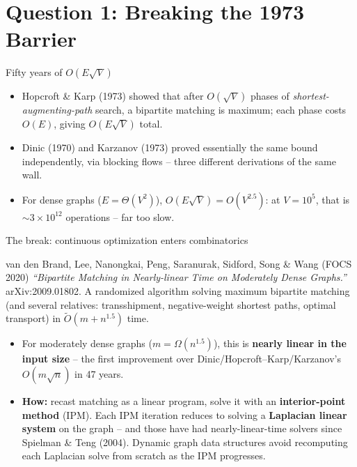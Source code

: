 \documentclass[11pt,aspectratio=169]{beamer}
\begin{document}
\section{Question 1: Breaking the 1973 Barrier}

\begin{frame}{Fifty years of $O(E\sqrt{V})$}
  \begin{itemize}
    \item Hopcroft \& Karp (1973) showed that after $O(\sqrt{V})$ phases of
    \emph{shortest-augmenting-path} search, a bipartite matching is maximum; each
    phase costs $O(E)$, giving $O(E\sqrt{V})$ total.
    \item Dinic (1970) and Karzanov (1973) proved essentially the same bound
    independently, via blocking flows -- three different derivations of the same wall.
    \item For dense graphs ($E = \Theta(V^2)$), $O(E\sqrt{V}) = O(V^{2.5})$: at
    $V=10^5$, that is $\sim 3\times10^{12}$ operations -- far too slow.
  \end{itemize}
\end{frame}

\begin{frame}{The break: continuous optimization enters combinatorics}
  \begin{block}{van den Brand, Lee, Nanongkai, Peng, Saranurak, Sidford, Song \& Wang
  (FOCS 2020)}
    \emph{``Bipartite Matching in Nearly-linear Time on Moderately Dense Graphs.''}
    arXiv:2009.01802. A randomized algorithm solving maximum bipartite matching (and
    several relatives: transshipment, negative-weight shortest paths, optimal
    transport) in $\tilde{O}(m + n^{1.5})$ time.
  \end{block}
  \begin{itemize}
    \item For moderately dense graphs ($m = \Omega(n^{1.5})$), this is
    \textbf{nearly linear in the input size} -- the first improvement over
    Dinic/Hopcroft--Karp/Karzanov's $O(m\sqrt{n})$ in 47 years.
    \item \textbf{How:} recast matching as a linear program, solve it with an
    \textbf{interior-point method} (IPM). Each IPM iteration reduces to solving a
    \textbf{Laplacian linear system} on the graph -- and those have had
    nearly-linear-time solvers since Spielman \& Teng (2004). Dynamic graph data
    structures avoid recomputing each Laplacian solve from scratch as the IPM
    progresses.
  \end{itemize}
\end{frame}
\end{document}
